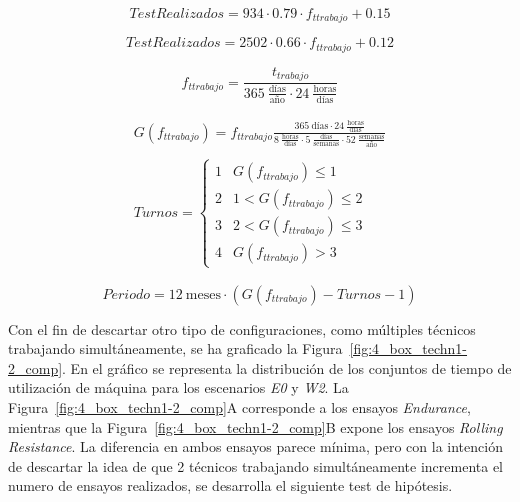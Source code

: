 \begin{equation}
	Test Realizados = 934 \cdot 0.79 \cdot f_{t trabajo} + 0.15
	\label{eq:qced}
\end{equation}

\begin{equation}
	Test Realizados = 2502 \cdot 0.66 \cdot f_{t trabajo} + 0.12
	\label{eq:rr}
\end{equation}

\begin{equation}
	f_{t trabajo}= \frac{t_{trabajo}}{365~\frac{\text{días}}{\text{año}} \cdot
	24~\frac{\text{horas}}{\text{días}}}
	\label{eq:f_hours}
\end{equation}

\begin{equation}
	\begin{array}{c}
		G(f_{t trabajo}) = f_{t trabajo}
		\frac{365~\text{días}
		\cdot 24~\frac{\text{horas}}{\text{días}}}
		{8~\frac{\text{horas}}{\text{días}} \cdot
			5~\frac{\text{días}}{\text{semanas}} \cdot
		52~\frac{\text{semanas}}{\text{año}}} \\
		\\
		Turnos= 
		\begin{cases}
			1	& G(f_{t trabajo}) \leq 1 \\
			2	& 1 < G(f_{t trabajo}) \leq 2 \\
			3	& 2 < G(f_{t trabajo}) \leq 3 \\
			4	& G(f_{t trabajo}) > 3
		\end{cases}
	\end{array}
	\label{eq:gf}
\end{equation}

\begin{equation}
	Periodo = 12~\text{meses} \cdot (G(f_{t trabajo}) - Turnos -1)
	\label{eq:period}
\end{equation}

Con el fin de descartar otro tipo de configuraciones,
como múltiples técnicos trabajando simultáneamente,
se ha graficado la Figura~\ref{fig:4_box_techn1-2_comp}.
En el gráfico se representa la distribución de los conjuntos de
tiempo de utilización de máquina para los escenarios \textit{E0} y \textit{W2}.
La Figura~\ref{fig:4_box_techn1-2_comp}A
corresponde a los ensayos \textit{Endurance},
mientras que la Figura~\ref{fig:4_box_techn1-2_comp}B
expone los ensayos \textit{Rolling Resistance}.
La diferencia en ambos ensayos parece mínima,
pero con la intención de descartar la idea de que
2 técnicos trabajando simultáneamente incrementa el numero de ensayos realizados,
se desarrolla el siguiente test de hipótesis.

